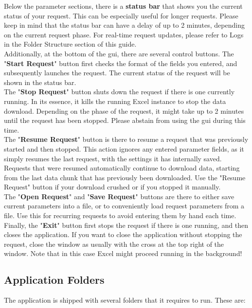 Below the parameter sections, there is a \textbf{status bar} that shows you the current status of your request. This can be especially useful for longer requests. Please keep in mind that the status bar can have a delay of up to 2 minutes, depending on the current request phase. For real-time request updates, please refer to Logs in the Folder Structure section of this guide. \\

Additionally, at the bottom of the gui, there are several control buttons. The "\textbf{Start Request}" button first checks the format of the fields you entered, and subsequently launches the request. The current status of the request will be shown in the status bar. \\


The "\textbf{Stop Request}" button shuts down the request if there is one currently running. In its essence, it kills the running Excel instance to stop the data download. Depending on the phase of the request, it might take up to 2 minutes until the request has been stopped. Please abstain from using the gui during this time. \\


The "\textbf{Resume Request}" button is there to resume a request that was previously started and then stopped. This action ignores any entered parameter fields, as it simply resumes the last request, with the settings it has internally saved. Requests that were resumed automatically continue to download data, starting from the last data chunk that has previously been downloaded. Use the "Resume Request" button if your download crushed or if you stopped it manually. \\


The "\textbf{Open Request}" and "\textbf{Save Request}" buttons are there to either save current parameters into a file, or to conveniently load request parameters from a file. Use this for recurring requests to avoid entering them by hand each time. \\


Finally, the "\textbf{Exit}" button first stops the request if there is one running, and then closes the application. If you want to close the application without stopping the request, close the window as usually with the cross at the top right of the window. Note that in this case Excel might proceed running in the background!

\subsection{Application Folders}
The application is shipped with several folders that it requires to run. These are: 


